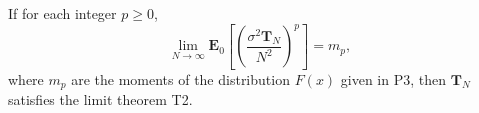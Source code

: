 If for each integer $p \geq 0$,
$$\lim_{N \to \infty} \mathbf{E}_0 \left[ \left( \frac{\sigma^2 \mathbf{T}_N}{N^2} \right)^p \right] = m_p,$$
where $m_p$ are the moments of the distribution $F(x)$ given in P3, then $\mathbf{T}_N$ satisfies the limit theorem T2.
